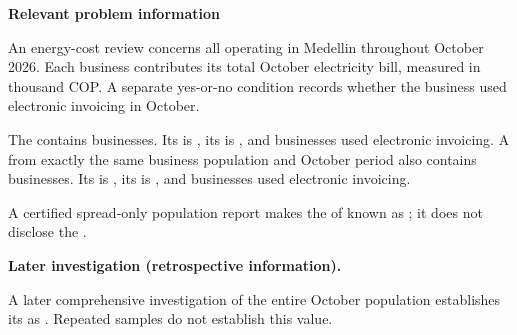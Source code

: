 \clearpage



\textbf{Relevant problem information}

\begin{probleminfoexcerpt}
An energy-cost review concerns all     operating in Medellin throughout October 2026. Each business contributes its total October electricity bill, measured in thousand COP. A separate yes-or-no condition records whether the business used electronic invoicing in October.
\end{probleminfoexcerpt}

\begin{probleminfoexcerpt}
The     contains  businesses. Its   is   , its    is   , and  businesses used electronic invoicing. A     from exactly the same business population and October period also contains  businesses. Its   is   , its    is   , and  businesses used electronic invoicing.
\end{probleminfoexcerpt}

\begin{probleminfoexcerpt}
A certified spread-only population report makes the    of  known as   ; it does not disclose the   .
\end{probleminfoexcerpt}

\textbf{Later investigation (retrospective information).}

\begin{probleminfoexcerpt}
A later comprehensive investigation of the entire October population establishes its   as   . Repeated samples do not establish this value.
\end{probleminfoexcerpt}

